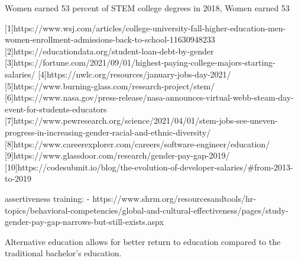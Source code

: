 \documentclass[review]{elsarticle}
\begin{document}
Women earned 53 percent of STEM college degrees in 2018,
Women earned 53%

[1]https://www.wsj.com/articles/college-university-fall-higher-education-men-women-enrollment-admissions-back-to-school-11630948233
[2]https://educationdata.org/student-loan-debt-by-gender
[3]https://fortune.com/2021/09/01/highest-paying-college-majors-starting-salaries/
[4]https://nwlc.org/resources/january-jobs-day-2021/
[5]https://www.burning-glass.com/research-project/stem/
[6]https://www.nasa.gov/press-release/nasa-announces-virtual-webb-steam-day-event-for-students-educators
[7]https://www.pewresearch.org/science/2021/04/01/stem-jobs-see-uneven-progress-in-increasing-gender-racial-and-ethnic-diversity/
[8]https://www.careerexplorer.com/careers/software-engineer/education/
[9]https://www.glassdoor.com/research/gender-pay-gap-2019/
[10]https://codesubmit.io/blog/the-evolution-of-developer-salaries/#from-2013-to-2019

assertiveness training:
 - https://www.shrm.org/resourcesandtools/hr-topics/behavioral-competencies/global-and-cultural-effectiveness/pages/study-gender-pay-gap-narrows-but-still-exists.aspx

Alternative education allows for better return to education compared to the traditional bachelor's education.
\end{document}
